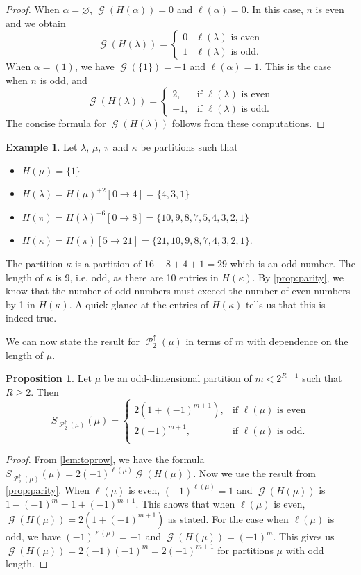 \documentclass[12pt]{amsart}
\theoremstyle{definition}
\newtheorem{example}[theorem]{Example}
\newtheorem{proposition}[theorem]{Proposition}
\numberwithin{equation}{section}
\newcommand{\la}{\lambda}
\DeclareMathOperator{\p}{\mathcal{P}}
\DeclareMathOperator{\g}{\mathcal{G}}
\begin{document}
\begin{proof}
When $\alpha = \varnothing$, $\g(H(\alpha)) = 0$ and $\ell(\alpha) = 0$. In this case, $n$ is even and we obtain
\[\g(H(\lambda)) = 
\begin{cases}
0 & \ell(\lambda) \text{ is even}\\
1 &\ell(\lambda)\text{ is odd.}
\end{cases}
\]
When $\alpha = (1)$, we have $\g(\{1\}) = -1$ and $\ell(\alpha) = 1$. This is the case when $n$ is odd, and
\[\g(H(\lambda)) = 
\begin{cases}
2, &\text{if }\ell(\lambda)\text{ is even}\\
-1, & \text{if }\ell(\lambda) \text{ is odd.}
\end{cases}
\]
The concise formula for $\g(H(\la))$ follows from these computations.
\end{proof}
\begin{example}
Let $\lambda$, $\mu$, $\pi$ and $\kappa$ be partitions such that
\begin{itemize}
\item $H(\mu) = \{1\}$ 
\item $H(\la) = H(\mu)^{+2}[0\to 4] =  \{4,3,1\}$
\item $H(\pi) = H(\la)^{+6}[0\to 8] = \{10,9,8,7,5,4,3,2,1\}$
\item $H(\kappa) = H(\pi)[5\to 21] = \{21,10,9,8,7,4,3,2,1\}$.
\end{itemize}
The partition $\kappa$ is a partition of $16 + 8 + 4 + 1 = 29$ which is an odd number. The length of $\kappa$ is 9, i.e. odd, as there are 10 entries in $H(\kappa)$. By \cref{prop:parity}, we know that the number of odd numbers must exceed the number of even numbers by 1 in $H(\kappa)$. A quick glance at the entries of $H(\kappa)$ tells us that this is indeed true.
\end{example}

We can now state the result for $\p_2^\uparrow(\mu)$ in terms of $m$ with dependence on the length of $\mu$.
\begin{proposition}\label{prop:toprow}
    Let $\mu$ be an odd-dimensional partition of $m < 2^{R-1}$ such that $R\geq 2$. Then
 \[
S_{\p_2^\uparrow(\mu)}(\mu) = \begin{cases}
2(1 + (-1)^{m+1}), &\text{if } \ell(\mu) \text{ is even}\\
2(-1)^{m+1}, & \text{if } \ell(\mu) \text{ is odd}.\\
\end{cases}
\]
\end{proposition}
\begin{proof}
    From \cref{lem:toprow}, we have the formula $S_{\p_2^\uparrow(\mu)}(\mu) = 2(-1)^{\ell(\mu)}\g(H(\mu))$. Now we use the result from \cref{prop:parity}. 
    When $\ell(\mu)$ is even, $(-1)^{\ell(\mu)} = 1$ and $\g(H(\mu))$ is $1 - (-1)^m = 1 + (-1)^{m+1}$. This shows that when $\ell(\mu)$ is even, $\g(H(\mu)) = 2(1 + (-1)^{m+1})$ as stated. For the case when $\ell(\mu)$ is odd, we have $(-1)^{\ell(\mu)} = -1$ and $\g(H(\mu)) = (-1)^m$. This gives us $\g(H(\mu)) = 2(-1)(-1)^m = 2(-1)^{m+1}$ for partitions $\mu$ with odd length.
\end{proof}
\end{document}
